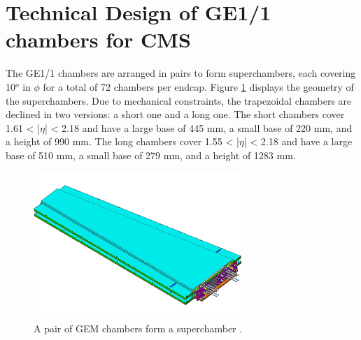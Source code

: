   \section{Technical Design of GE1/1 chambers for CMS}

    The GE1/1 chambers are arranged in pairs to form superchambers, each covering 10$^o$ in $ \phi $ for a total of 72 chambers per endcap. Figure \ref{fig:II-1-superchamber} displays the geometry of the superchambers. Due to mechanical constraints, the trapezoidal chambers are declined in two versions: a short one and a long one. The short chambers cover 1.61 < |$\eta$| < 2.18 and have a large base of 445 mm, a small base of 220 mm, and a height of 990 mm. The long chambers cover 1.55 < |$\eta$| < 2.18 and have a large base of 510 mm, a small base of 279 mm, and a height of 1283 mm. \\

    \begin{figure}[b!]
      \centering
      \includegraphics[width=0.7\textwidth]{img/II-1-gem/superchamber.pdf}
      \caption{A pair of GEM chambers form a superchamber \cite{Colaleo:2021453}.}
      \label{fig:II-1-superchamber}
    \end{figure}

